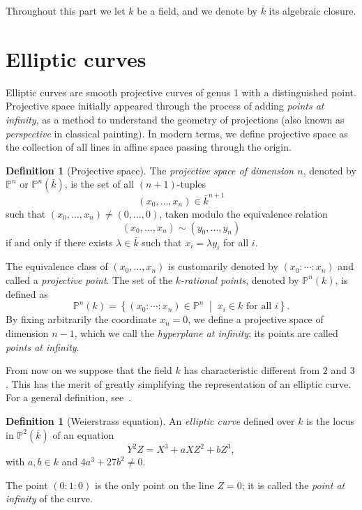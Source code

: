 \documentclass[10pt]{article}
\theoremstyle{plain}
\theoremstyle{definition}
\newtheorem{definition}[theorem]{Definition}
\def\P{\ensuremath{\mathbb{P}}}
\begin{document}
Throughout this part we let $k$ be a field, and we denote by $\bar{k}$
its algebraic closure. %

\section{Elliptic curves}
\label{sec:elliptic-curves}

Elliptic curves are smooth projective curves of genus 1 with a
distinguished point. %
Projective space initially appeared through the process of adding
\emph{points at infinity}, as a method to understand the geometry of
projections (also known as \emph{perspective} in classical
painting). %
In modern terms, we define projective space as the collection of all
lines in affine space passing through the origin.

\begin{definition}[Projective space]
  The \emph{projective space of dimension $n$}, denoted by $\P^n$ or
  $\P^n(\bar{k})$, is the set of all $(n+1)$-tuples
  \[(x_0,\dots,x_n) ∈ \bar{k}^{n+1}\] %
  such that $(x_0,\dots,x_n) ≠ (0,\dots,0)$, taken modulo the
  equivalence relation
  \[(x_0,\dots,x_n) \sim (y_0,\dots,y_n)\] %
  if and only if there exists $λ\in\bar{k}$ such that
  $x_i=λy_i$ for all $i$.
\end{definition}

The equivalence class of $(x_0,\dots,x_n)$ is customarily denoted by
$(x_0:\cdots:x_n)$ and called a \emph{projective point}. %
The set of the \emph{$k$-rational points}, denoted by $\P^n(k)$, is
defined as
\[\P^n(k) = \left\{(x_0:\cdots:x_n)∈\P^n\;\middle|\; x_i ∈ k \text{ for all $i$}\right\}.\] %
By fixing arbitrarily the coordinate $x_n=0$, we define a projective
space of dimension $n-1$, which we call the \emph{hyperplane at
  infinity}; its points are called \emph{points at infinity}.

From now on we suppose that the field $k$ has characteristic different
from $2$ and $3$. %
This has the merit of greatly simplifying the representation of an
elliptic curve. %
For a general definition, see~\cite[Chap.~III]{silverman:elliptic}.

\begin{definition}[Weierstrass equation]
  An \emph{elliptic curve} defined over $k$ is the locus in
  $\P^2(\bar{k})$ of an equation
  \begin{equation}
    \label{eq:weierstrass}
    Y^2Z = X^3 + aXZ^2 + bZ^3,    
  \end{equation}
  with $a,b∈k$ and $4a^3+27b^2\ne0$.

  The point $(0:1:0)$ is the only point on the line $Z=0$; it is
  called the \emph{point at infinity} of the curve.
\end{definition}
\end{document}
